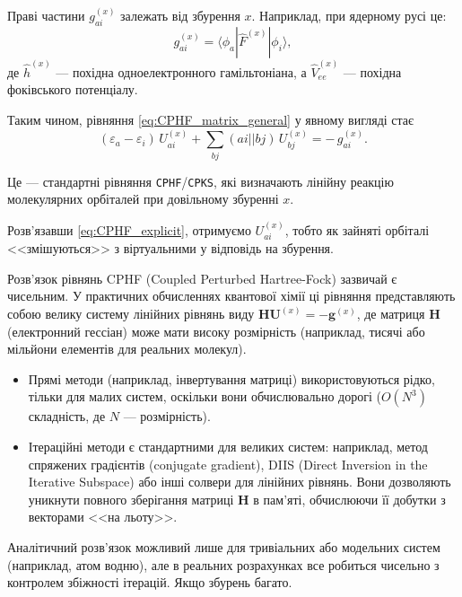 \documentclass{PySCFBook}
\begin{document}
Праві частини $g_{ai}^{(x)}$ залежать від збурення $x$.
Наприклад, при ядерному русі це:
\[
g_{ai}^{(x)} = \langle \phi_a | \hat F^{(x)} | \phi_i \rangle,
\]
де $\hat h^{(x)}$ --- похідна одноелектронного гамільтоніана,
а $\hat V^{(x)}_{ee}$ --- похідна фоківського потенціалу.

Таким чином, рівняння \eqref{eq:CPHF_matrix_general} у явному вигляді стає
\begin{equation}\label{eq:CPHF_explicit}
(\varepsilon_a - \varepsilon_i)\,U_{ai}^{(x)}
+ \sum_{b j} (ai||bj)\,U_{bj}^{(x)}
= -\,g_{ai}^{(x)}.
\end{equation}

Це --- стандартні рівняння \texttt{CPHF}/\texttt{CPKS}, які визначають
лінійну реакцію молекулярних орбіталей при довільному збуренні $x$.


Розв'язавши \eqref{eq:CPHF_explicit}, отримуємо $U_{ai}^{(x)}$,
тобто як зайняті орбіталі <<змішуються>> з віртуальними у відповідь на збурення.

\begin{commentbox}
Розв'язок рівнянь CPHF (Coupled Perturbed Hartree-Fock) зазвичай є чисельним. У практичних обчисленнях квантової хімії ці рівняння представляють собою велику систему лінійних рівнянь виду $\mathbf{H} \mathbf{U}^{(x)} = -\mathbf{g}^{(x)}$, де матриця $\mathbf{H}$ (електронний гессіан) може мати високу розмірність (наприклад, тисячі або мільйони елементів для реальних молекул).

\begin{itemize}
\item Прямі методи (наприклад, інвертування матриці) використовуються рідко, тільки для малих систем, оскільки вони обчислювально дорогі ($O(N^3)$ складність, де $N$ --- розмірність).
\item Ітераційні методи є стандартними для великих систем: наприклад, метод спряжених градієнтів (conjugate gradient), DIIS (Direct Inversion in the Iterative Subspace) або інші солвери для лінійних рівнянь. Вони дозволяють уникнути повного зберігання матриці $\mathbf{H}$ в пам'яті, обчислюючи її добутки з векторами <<на льоту>>.
\end{itemize}

Аналітичний розв'язок можливий лише для тривіальних або модельних систем (наприклад, атом водню), але в реальних розрахунках все робиться чисельно з контролем збіжності ітерацій. Якщо збурень багато.
\end{commentbox}
\end{document}
